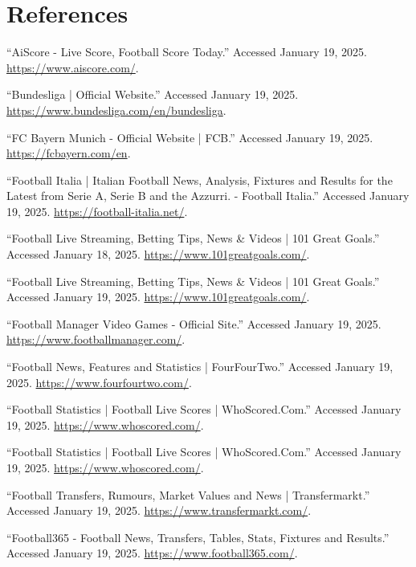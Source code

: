 \chapter{References}
\label{chap:references}

\begin{thebibliography}{9}

“AiScore - Live Score, Football Score Today.” Accessed January 19, 2025. \url{https://www.aiscore.com/}.

“Bundesliga | Official Website.” Accessed January 19, 2025. \url{https://www.bundesliga.com/en/bundesliga}.

“FC Bayern Munich - Official Website | FCB.” Accessed January 19, 2025. \url{https://fcbayern.com/en}.

“Football Italia | Italian Football News, Analysis, Fixtures and Results for the Latest from Serie A, Serie B and the Azzurri. - Football Italia.” Accessed January 19, 2025. \url{https://football-italia.net/}.

“Football Live Streaming, Betting Tips, News \& Videos | 101 Great Goals.” Accessed January 18, 2025. \url{https://www.101greatgoals.com/}.

“Football Live Streaming, Betting Tips, News \& Videos | 101 Great Goals.” Accessed January 19, 2025. \url{https://www.101greatgoals.com/}.

“Football Manager Video Games - Official Site.” Accessed January 19, 2025. \url{https://www.footballmanager.com/}.

“Football News, Features and Statistics | FourFourTwo.” Accessed January 19, 2025. \url{https://www.fourfourtwo.com/}.

“Football Statistics | Football Live Scores | WhoScored.Com.” Accessed January 19, 2025. \url{https://www.whoscored.com/}.

“Football Statistics | Football Live Scores | WhoScored.Com.” Accessed January 19, 2025. \url{https://www.whoscored.com/}.

“Football Transfers, Rumours, Market Values and News | Transfermarkt.” Accessed January 19, 2025. \url{https://www.transfermarkt.com/}.

“Football365 - Football News, Transfers, Tables, Stats, Fixtures and Results.” Accessed January 19, 2025. \url{https://www.football365.com/}.


\end{thebibliography}
